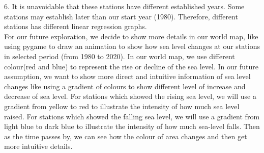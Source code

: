 \documentclass[fontsize=11pt]{article}
\begin{document}
    6. It is unavoidable that these stations have different established years. Some stations may establish later than our start year (1980). Therefore, different stations has different linear regression graphs.\\
    For our future exploration, we decide to show more details in our world map, like using pygame to draw an animation to show how sea level changes at our stations in selected period (from 1980 to 2020). In our world map, we use different colour(red and blue) to represent the rise or decline of the sea level. In our future assumption, we want to show more direct and intuitive information of sea level changes like using a gradient of colours to show different level of increase and decrease of sea level. For stations which showed the rising sea level, we will use a gradient from yellow to red to illustrate the intensity of how much sea level raised. For stations which showed the falling sea level, we will use a gradient from light blue to dark blue to illustrate the intensity of how much sea-level falls. Then as the time passes by, we can see how the colour of area changes and then get more intuitive details.
\end{document}
